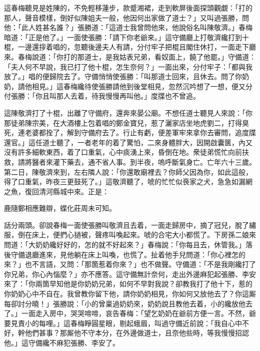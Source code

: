 這春梅聽見是姓陳的，{}不免輕移蓮步，款蹙湘裙，走到軟屏後面探頭觀覷：「打的那人，聲音模樣，倒好似陳姐夫一般，他因何出家做了道士？」又叫過張勝，問他：「此人姓甚名誰？」張勝道：「這道士我曾問他來，他說俗名叫陳敬濟。」春梅暗道：「正是他了。」{}一面使張勝：「請下你老爺來。」這守備廳上打敬濟纔打到十棍，一邊還拶着唱的，忽聽後邊夫人有請，分付牢子把棍且閣住休打，一面走下廳來。春梅說道：「你打的那道士，是我姑表兄弟，看奴面上，饒了他罷。」守備道：「夫人何不早說，我已打了他十棍，怎生奈何？」一面出來，分付牢子：「都與我放了。」唱的便歸院去了。守備悄悄使張勝：「叫那道士回來，且休去。問了你奶奶，請他相見。」這春梅纔待使張勝請他到後堂相見，忽然沉吟想了一想，便又分付張勝：「你且叫那人去着，待我慢慢再叫他。」{}度牒也不曾追。

這陳敬濟打了十棍，出離了守備府，還奔來晏公廟。不想任道士聽見人來說：「你那徒弟陳宗美，在大酒樓上包着唱的鄭金寶兒，惹了灑家店坐地虎劉二，打得臭死，連老婆都拴了，解到守備府去了。行止有虧，便差軍牢來拿你去審問，追度牒還官。」這任道士聽了，一者老年的着了驚怕，二來身體胖大，因開啟囊篋，內又沒有許多細軟東西，着了口重氣，心中痰湧上來，昏倒在地。衆徒弟慌忙向前扶救，請將醫者來灌下藥去，通不省人事。到半夜，嗚呼斷氣身亡。亡年六十三歲。{}第二日，陳敬濟來到，左右隣人說：「你還敢廟裡去？你師父因為你，如此這般，得了口重氣，昨夜三更鼓死了。」這敬濟聽了，唬的忙忙似䘮家之犬，急急如漏網之魚，復回清河縣城中來。正是：

\begin{myquote}
鹿隨鄭相應難辯，蝶化莊周未可知。
\end{myquote}

話分兩頭。卻說春梅一面使張勝叫敬濟且去着，一面走歸房中，摘了冠兒，脫了繡服，倒在床上，便捫心撾被，聲疼叫喚起來。{}唬的合宅大小都慌了。下房孫二娘來問道：「大奶奶纔好好的，怎的就不好起來？」春梅說：「你每且去，休管我。」落後守備退廳進來，見他躺在床上叫喚，也慌了。扯着他手兒問道：「你心裡怎的來？」也不言語，又問：「那箇惹着你來？」也不做聲。守備道：「不是我剛纔打了你兄弟，你心內惱麼？」亦不應答。{}這守備無計奈何，走出外邊麻犯起張勝、李安來了：「你兩箇早知他是你奶奶兄弟，如何不早對我說？卻教我打了他十下，惹的你奶奶心中不自在。我曾教你留下他，請你奶奶相見，你如何又放他去了？你這厮每卻討分曉！」張勝說：「小的曾稟過奶奶來，奶奶說且教他去着，小的纔放他去了。」一面走入房中，哭哭啼啼，哀告春梅：「望乞奶奶在爺前方便一言。不然，爺要見責小的每哩。」這春梅睜圓星眼，剔起蛾眉，叫過守備近前說：「我自心中不好，幹他們甚事？那厮他不守本分，在外邊做道士，且奈他些時，等我慢慢招認他。」{}這守備纔不麻犯張勝、李安了。


